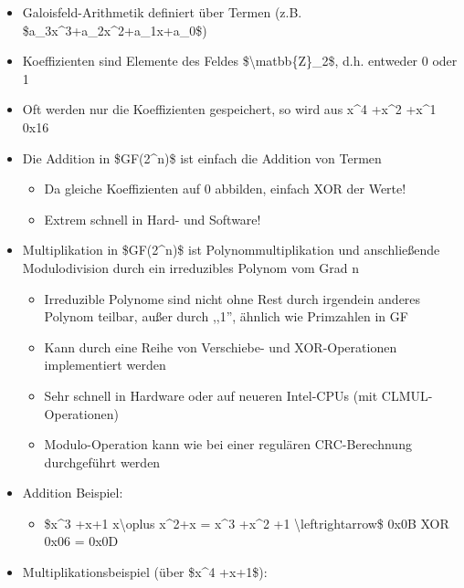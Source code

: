 \documentclass[a4paper]{article}
\begin{document}
\begin{multicols}{3}
    \begin{itemize}
        \item
              Galoisfeld-Arithmetik definiert über Termen (z.B.
              \$a\_3x\^{}3+a\_2x\^{}2+a\_1x+a\_0\$)
        \item
              Koeffizienten sind Elemente des Feldes
              \$\textbackslash matbb\{Z\}\_2\$, d.h. entweder 0 oder 1
        \item
              Oft werden nur die Koeffizienten gespeichert, so wird aus x\^{}4
              +x\^{}2 +x\^{}1 0x16
        \item
              Die Addition in \$GF(2\^{}n)\$ ist einfach die Addition von Termen

              \begin{itemize}
                  \item
                        Da gleiche Koeffizienten auf 0 abbilden, einfach XOR der Werte!
                  \item
                        Extrem schnell in Hard- und Software!
              \end{itemize}
        \item
              Multiplikation in \$GF(2\^{}n)\$ ist Polynommultiplikation und
              anschließende Modulodivision durch ein irreduzibles Polynom vom Grad n

              \begin{itemize}
                  \item
                        Irreduzible Polynome sind nicht ohne Rest durch irgendein anderes
                        Polynom teilbar, außer durch ,,1'', ähnlich wie Primzahlen in GF
                  \item
                        Kann durch eine Reihe von Verschiebe- und XOR-Operationen
                        implementiert werden
                  \item
                        Sehr schnell in Hardware oder auf neueren Intel-CPUs (mit
                        CLMUL-Operationen)
                  \item
                        Modulo-Operation kann wie bei einer regulären CRC-Berechnung
                        durchgeführt werden
              \end{itemize}
        \item
              Addition Beispiel:

              \begin{itemize}
                  \item
                        \$x\^{}3 +x+1 x\textbackslash oplus x\^{}2+x = x\^{}3 +x\^{}2 +1
                        \textbackslash leftrightarrow\$ 0x0B XOR 0x06 = 0x0D
              \end{itemize}
        \item
              Multiplikationsbeispiel (über \$x\^{}4 +x+1\$):


\end{itemize}
\end{multicols}
\end{document}
